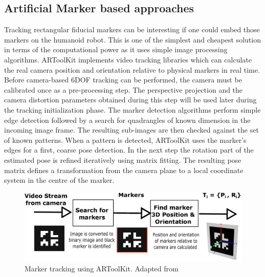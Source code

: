 \subsection{Artificial Marker based approaches}
Tracking rectangular fiducial markers can be interesting if one could embed those markers on the humanoid robot. This is one of the simplest and cheapest solution in terms of the computational power as it uses simple image processing algorithms. ARToolKit \cite{kato1999marker} implements video tracking libraries which can calculate the real camera position and orientation relative to physical markers in real time. Before camera-based 6DOF tracking can be performed, the camera must be calibrated once as a pre-processing step. The perspective projection and the camera distortion parameters obtained during this step will be used later during the tracking initialization phase. The marker detection algorithms perform simple edge detection followed by a search for quadrangles of known dimension in the incoming image frame. The resulting sub-images are then checked against the set of known patterns. When a pattern is detected, ARToolKit uses the marker’s edges for a first, coarse pose detection. In the next step the rotation part of the estimated pose is refined iteratively using matrix fitting. The resulting pose matrix defines a transformation from the camera plane to a local coordinate system in the centre of the marker.
\begin{figure}[H]
\centering
\includegraphics[width=1\textwidth]{assets/artoolkit.eps}
\caption[Marker tracking using ARToolKit]{Marker tracking using ARToolKit. {Adapted from \cite{kato1999marker}}}
\label{fig:artoolkit}
\end{figure}
